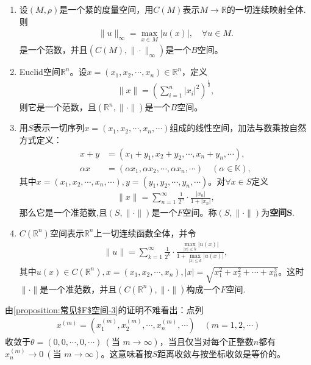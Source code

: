 \documentclass[../../main.tex]{subfiles}%
\begin{document}
\begin{proposition}\label{proposition:常见F空间}
\begin{enumerate}[(1)]
\item\label{proposition:常见F空间-1} 设$(M,\rho)$是一个紧的度量空间，用$C(M)$表示$M\to\mathbb{R}$的一切连续映射全体.则
\begin{align*}
\|u\|_{\infty} = \max_{x\in M}|u(x)|,\quad \forall u\in M.
\end{align*}
是一个范数，并且$(C(M),\|\cdot\|_{\infty})$是一个$B$空间。

\item Euclid空间$\mathbb{R}^n$。设$x=(x_1,x_2,\cdots,x_n)\in\mathbb{R}^n$，定义
\begin{align*}
\|x\|=\left(\sum_{i=1}^n|x_i|^2\right)^{\frac{1}{2}},
\end{align*}
则它是一个范数，且$(\mathbb{R}^n,\|\cdot\|)$是一个$B$空间。

\item\label{proposition:常见$F$空间-3} 用$S$表示一切序列$x=(x_1,x_2,\cdots,x_n,\cdots)$组成的线性空间，加法与数乘按自然方式定义：
\begin{align*}
x+y&=(x_1+y_1,x_2+y_2,\cdots,x_n+y_n,\cdots),\\
\alpha x&=(\alpha x_1,\alpha x_2,\cdots,\alpha x_n,\cdots)\quad(\alpha\in\mathbb{K}),
\end{align*}
其中$x=(x_1,x_2,\cdots,x_n,\cdots),y=(y_1,y_2,\cdots,y_n,\cdots)$。对$\forall x\in S$定义
\begin{align*}
\|x\|=\sum_{n=1}^\infty\frac{1}{2^n}\cdot\frac{|x_n|}{1+|x_n|},
\end{align*}
那么它是一个准范数,且$(S,\|\cdot\|)$是一个$F$空间。称$(S,\|\cdot\|)$为\textbf{空间}$\bm{S}$.

\item $C(\mathbb{R}^n)$空间表示$\mathbb{R}^n$上一切连续函数全体，并令
\begin{align*}
\parallel u\parallel =\sum_{k=1}^{\infty}{\frac{1}{2^k}}\cdot \frac{\max\limits_{|x|\leqslant k} |u(x)|}{1+\max\limits_{|x|\leqslant k} |u(x)|},
\end{align*}
其中$u(x)\in C(\mathbb{R}^n),x=(x_1,x_2,\cdots,x_n),|x|=\sqrt{x_1^2+x_2^2+\cdots+x_n^2}$。这时$\|\cdot\|$是一个准范数，并且$(C(\mathbb{R}^n),\|\cdot\|)$构成一个$F$空间.
\end{enumerate}
\end{proposition}
\begin{remark}
由\ref{proposition:常见$F$空间-3}的证明不难看出：点列
\begin{align*}
x^{(m)}=(x_1^{(m)},x_2^{(m)},\cdots,x_n^{(m)},\cdots)\quad(m=1,2,\cdots)
\end{align*}
收敛于$\theta=(0,0,\cdots,0,\cdots)\ (\text{当 }m\to\infty)$，当且仅当对每个正整数$n$都有$x_n^{(m)}\to0\ (\text{当 }m\to\infty)$。这意味着按$S$距离收敛与按坐标收敛是等价的。
\end{remark}
\end{document}
